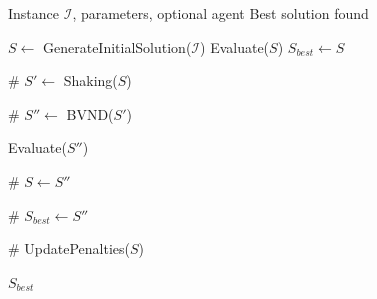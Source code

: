 \documentclass{article}
\begin{document}
\begin{algorithm}[H]
\caption{General Variable Neighborhood Search (GVNS)}
\begin{algorithmic}[1]
\Require Instance $\mathcal{I}$, parameters, optional agent
\Ensure Best solution found

\State $S \gets$ GenerateInitialSolution($\mathcal{I}$)
\State Evaluate($S$)
\State $S_{best} \gets S$
\State \phantom{}


    \State \# 
    \State $S' \gets$ Shaking($S$)

    \State \phantom{}

    \State \# 
    \State $S'' \gets$ BVND($S'$)

    \State Evaluate($S''$)

    \State \phantom{}

    \State \# 
        \State $S \gets S''$
    \EndIf

    \State \phantom{}

    \State \# 
        \State $S_{best} \gets S''$
    \EndIf

    \State \phantom{}

    \State \# 
    \State UpdatePenalties($S$)

\EndWhile

\State \Return $S_{best}$

\end{algorithmic}
\end{algorithm}
\end{document}

